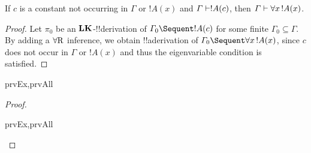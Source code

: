 \documentclass[../../../include/open-logic-section]{subfiles}
\begin{document}

\begin{thm}
 If $c$ is a constant not occurring
in $\Gamma$ or $!A(x)$ and $\Gamma \Proves !A(c)$, then $\Gamma
\Proves \lforall[x][!A(x)]$.
\end{thm}

\begin{proof}
Let $\pi_0$ be an $\Log{LK}$-!!{derivation} of $\Gamma_0 \Sequent !A(c)$
for some finite $\Gamma_0 \subseteq \Gamma$.  By adding a
$\RightR{\lforall}$ inference, we obtain !!a{derivation} of $\Gamma_0 \Sequent
\lforall[x][!A(x)]$, since $c$ does not occur in $\Gamma$ or $!A(x)$
and thus the eigenvariable condition is satisfied.
\end{proof}

\begin{prop}
\begin{tagenumerate}{prvEx,prvAll}
\end{tagenumerate}
\end{prop}

\begin{proof}
\begin{tagenumerate}{prvEx,prvAll}
\end{tagenumerate}
\end{proof}
\end{document}
